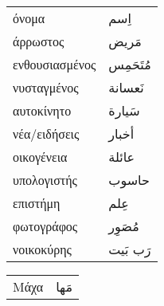 \documentclass[twocolumn,a4paper]{article}
\newcommand{\ar}[1]{\textarabic{#1}}
\begin{document}
\begin{mpsupertabular}{ P{0.5\textwidth} P{0.5\textwidth} }
όνομα                & \ar{ اِسم } \\
άρρωστος             & \ar{ مَريض } \\
ενθουσιασμένος       & \ar{ مُتَحَمِس } \\
νυσταγμένος          & \ar{ نَعسانة } \\
αυτοκίνητο           & \ar{ سَيارة } \\
νέα/ειδήσεις         & \ar{ أخبار } \\
οικογένεια           & \ar{ عائلة } \\
υπολογιστής          & \ar{ حاسوب } \\
επιστήμη             & \ar{ عِلم } \\
φωτογράφος           & \ar{ مُصَوِر } \\
νοικοκύρης           & \ar{ رَب بَيت } \\

\end{mpsupertabular}
\clearpage

\begin{mpsupertabular}{ P{0.5\textwidth} P{0.5\textwidth} }
Μάχα               & \ar{ مَها } \\
\end{mpsupertabular}

\clearpage
\end{document}
